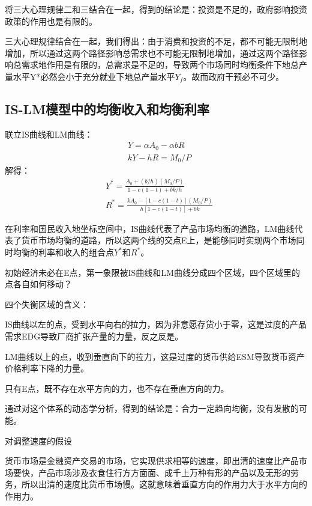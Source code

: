\documentclass{article}
\begin{document}
将三大心理规律二和三结合在一起，得到的结论是：投资是不足的，政府影响投资政策的作用也是有限的。

\hspace*{\fill}

三大心理规律结合在一起，我们得出：由于消费和投资的不足，都不可能无限制地增加，所以通过这两个路径影响总需求也不可能无限制地增加，通过这两个路径影响总需求地作用是有限的，总需求是不足的，导致两个市场同时均衡条件下地总产量水平Y*必然会小于充分就业下地总产量水平$ Y_f $。故而政府干预必不可少。

\subsection{IS-LM模型中的均衡收入和均衡利率}
联立IS曲线和LM曲线：
\begin{equation*}
	\begin{split}
	&Y=\alpha A_0-\alpha bR\\
	&kY-hR=M_0/P
	\end{split}
\end{equation*}
解得：
\begin{equation*}
	\begin{split}
	&Y^*=\frac{A_0+(b/h)(M_0/P)}{1-c(1-t)+bk/h}\\
	&R^*=\frac{kA_0-[1-c(1-t)](M_0/P)}{h[1-c(1-t)]+bk}
	\end{split}
\end{equation*}

在利率和国民收入地坐标空间中，IS曲线代表了产品市场均衡的道路，LM曲线代表了货币市场均衡的道路，所以这两个线的交点E上，是能够同时实现两个市场同时均衡的利率和收入的组合点$ Y^* $和$ R^* $。

初始经济未必在E点，第一象限被IS曲线和LM曲线分成四个区域，四个区域里的点各自如何移动？

四个失衡区域的含义：

IS曲线以左的点，受到水平向右的拉力，因为非意愿存货小于零，这是过度的产品需求EDG导致厂商扩张产量的力量，反之反是。

LM曲线以上的点，收到垂直向下的拉力，这是过度的货币供给ESM导致货币资产价格利率下降的力量。

只有E点，既不存在水平方向的力，也不存在垂直方向的力。

通过对这个体系的动态学分析，得到的结论是：合力一定趋向均衡，没有发散的可能。

\hspace*{\fill}

对调整速度的假设

货币市场是金融资产交易的市场，它实现供求相等的速度，即出清的速度比产品市场要快，产品市场涉及衣食住行方方面面、成千上万种有形的产品以及无形的劳务，所以出清的速度比货币市场慢。这就意味着垂直方向的作用力大于水平方向的作用力。
\end{document}
